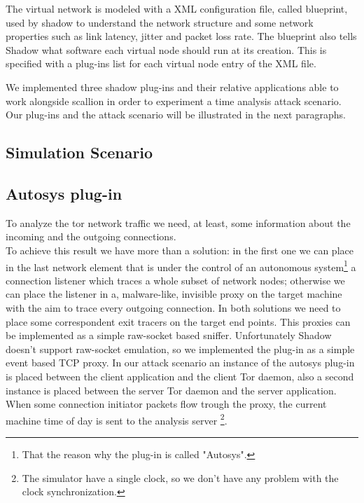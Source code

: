 The virtual network is modeled with a XML configuration
file, called blueprint, used by shadow to understand the network
structure and some network properties such as link latency, jitter and
packet loss rate. The blueprint also tells Shadow what software each
virtual node should run at its creation. This is specified with a
plug-ins list for each virtual node entry of the XML file.

We implemented three shadow plug-ins and their relative applications 
 able to work alongside scallion in
order to experiment a time analysis attack scenario. Our plug-ins and
the attack scenario will be illustrated in the next paragraphs.

\subsection{Simulation Scenario}

\subsection{Autosys plug-in}
To analyze the tor network traffic we need, at least, some information about
the incoming and the outgoing connections.\\
To achieve this result we have more than a solution: in the first one we can place 
in the last network element that is under the control of an autonomous system\footnote{
That the reason why the plug-in is called "Autosys".} a connection
listener which traces a whole subset of
network nodes;
otherwise we can place the listener in a, malware-like, invisible proxy on the target
machine with the aim to trace every outgoing connection. 
In both solutions we need to place some correspondent exit tracers on
the target end points.
This proxies can be implemented as a simple raw-socket based sniffer. 
Unfortunately Shadow doesn't support raw-socket
emulation, so we implemented the plug-in as a simple event based TCP
proxy. In our attack scenario an instance of the autosys plug-in is placed 
between the client application and the client Tor daemon, also a second
 instance is placed between the server Tor daemon and the server application.
\\

When some connection initiator packets flow trough the proxy, the
current machine time of day is sent to the analysis server
\footnote{The simulator have a single clock, so we don't have any problem with the
clock synchronization.}.

